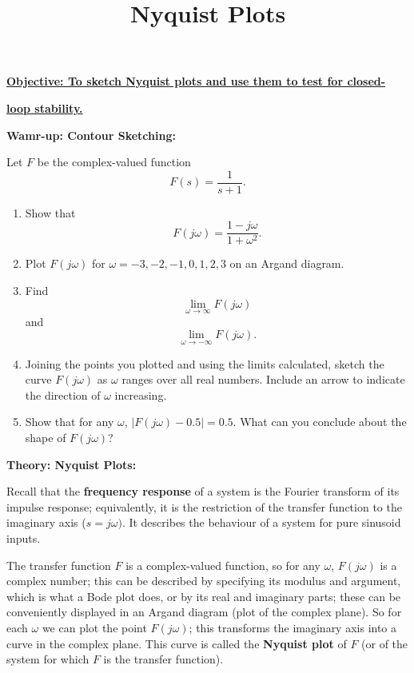 \documentclass{article}
\begin{document}
\title{Nyquist Plots}
\date{}

\maketitle
\thispagestyle{empty}

\Large

\vskip -10mm

\textbf{\underline{Objective: To sketch Nyquist plots and use them to test for closed-}}

\textbf{\underline{loop stability.}}



\vspace{5mm}



\textbf{Wamr-up: Contour Sketching:}\bigskip


Let $F$ be the complex-valued function
\[F(s)=\frac{1}{s+1}.\]

\begin{enumerate}
	\item Show that
		\[F(j\omega) = \frac{1-j\omega}{1+\omega^2}.\]
	\item Plot $F(j\omega)$ for $\omega=-3,-2,-1,0,1,2,3$ on an Argand diagram.
	\item Find
		\[\lim_{\omega\to \infty} F(j\omega)\]
		and
		\[\lim_{\omega\to -\infty} F(j\omega).\]
	\item Joining the points you plotted and using the limits calculated, sketch the curve $F(j\omega)$ as $\omega$ ranges over all real numbers. Include an arrow to indicate the direction of $\omega$ increasing.
	\item Show that for any $\omega$, $|F(j\omega)-0.5|=0.5$. What can you conclude about the shape of $F(j\omega)$?
\end{enumerate}







\clearpage


\textbf{Theory: Nyquist Plots:}\bigskip



Recall that the \textbf{frequency response} of a system is the Fourier transform of its impulse response; equivalently, it is the restriction of the transfer function to the imaginary axis ($s=j\omega)$. It describes the behaviour of a system for pure sinusoid inputs.

The transfer function $F$ is a complex-valued function, so for any $\omega$, $F(j\omega)$ is a complex number; this can be described by specifying its modulus and argument, which is what a Bode plot does, or by its real and imaginary parts; these can be conveniently displayed in an Argand diagram (plot of the complex plane). So for each $\omega$ we can plot the point $F(j\omega)$; this transforms the imaginary axis into a curve in the complex plane. This curve is called the \textbf{Nyquist plot} of $F$ (or of the system for which $F$ is the transfer function).
\end{document}
